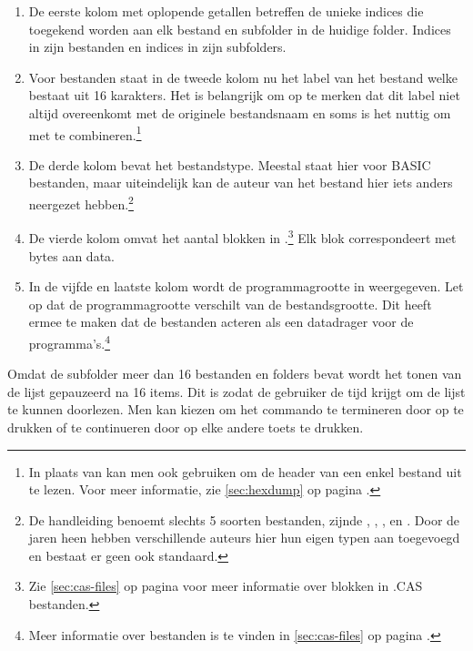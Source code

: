\begin{enumerate}[noitemsep]
    \item De eerste kolom met oplopende getallen betreffen de unieke indices die toegekend worden aan elk bestand en subfolder in de huidige folder. Indices in  zijn bestanden en indices in  zijn subfolders.  
    
    \item Voor \cas bestanden staat in de tweede kolom nu het label van het bestand welke bestaat uit 16 karakters. Het is belangrijk om op te merken dat dit label niet altijd overeenkomt met de originele bestandsnaam en soms is het nuttig om  met  te combineren.\footnote{In plaats van  kan men ook  gebruiken om de header van een enkel bestand uit te lezen. Voor meer informatie, zie \cref{sec:hexdump} op pagina \pageref{sec:hexdump}.}
    
    \item De derde kolom bevat het bestandstype. Meestal staat hier  voor BASIC bestanden, maar uiteindelijk kan de auteur van het \cas bestand hier iets anders neergezet hebben.\footnote{De  handleiding benoemt slechts 5 soorten bestanden, zijnde , , ,  en . Door de jaren heen hebben verschillende auteurs hier hun eigen typen aan toegevoegd en bestaat er geen ook standaard.} 
    
    \item De vierde kolom omvat het aantal blokken in .\footnote{Zie \cref{sec:cas-files} op pagina \pageref{sec:cas-files} voor meer informatie over blokken in .CAS bestanden.} Elk blok correspondeert met  bytes aan data.
    
    \item In de vijfde en laatste kolom wordt de programmagrootte in  weergegeven. Let op dat de programmagrootte verschilt van de bestandsgrootte. Dit heeft ermee te maken dat de \cas bestanden acteren als een datadrager voor de programma's.\footnote{Meer informatie over \cas bestanden is te vinden in \cref{sec:cas-files} op pagina \pageref{sec:cas-files}.}
\end{enumerate}

Omdat de subfolder  meer dan 16 bestanden en folders bevat wordt het tonen van de lijst gepauzeerd na 16 items. Dit is zodat de gebruiker de tijd krijgt om de lijst te kunnen doorlezen. Men kan kiezen om het commando te termineren door op  te drukken of te continueren door op elke andere toets te drukken.

